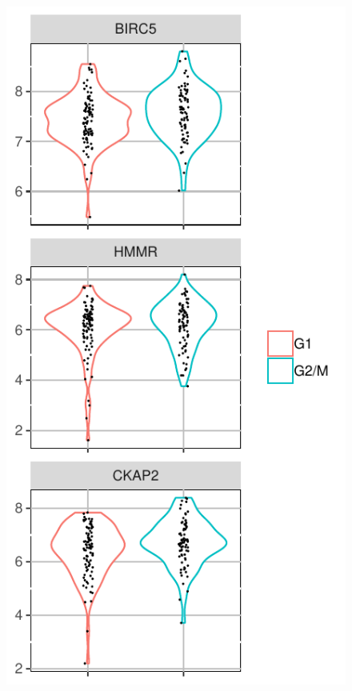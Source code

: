\documentclass[aoas,preprint]{imsart}
\begin{document}
\begin{figure}[H]
\vspace{-\parskip}
\includegraphics[clip,width=\textwidth]{Figs/FucciDD.pdf}
\endminipage
{}

\end{figure}
\end{document}
